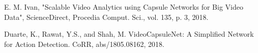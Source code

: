 \documentclass[a4paper,12pt]{report}
\begin{document}
\begin{thebibliography}{2}
E. M. Ivan, "Scalable Video Analytics using Capsule Networks for Big Video Data", ScienceDirect, Procedia Comput. Sci., vol. 135, p. 3, 2018.

Duarte, K., Rawat, Y.S., and Shah, M. VideoCapsuleNet: A Simplified Network for Action Detection. CoRR, abs/1805.08162, 2018.








\end{thebibliography}
\end{document}
